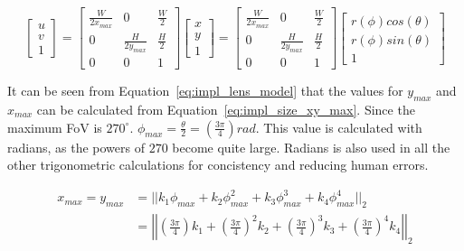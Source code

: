 \begin{equation}
    \begin{bmatrix}
        u \\ v \\ 1
    \end{bmatrix} = \begin{bmatrix}
        \frac{W}{2x_{max}} & 0 & \frac{W}{2} \\
        0 & \frac{H}{2y_{max}} & \frac{H}{2} \\
        0 & 0 & 1
    \end{bmatrix}\begin{bmatrix}
        x \\ y \\ 1
    \end{bmatrix} =
    \begin{bmatrix}
        \frac{W}{2x_{max}} & 0 & \frac{W}{2} \\
        0 & \frac{H}{2y_{max}} & \frac{H}{2} \\
        0 & 0 & 1
    \end{bmatrix}\begin{bmatrix}
        r(\phi) cos(\theta) \\ r(\phi) sin(\theta) \\ 1
    \end{bmatrix}
    \label{eq:impl_pixel_transform_final}
\end{equation}

It can be seen from Equation~\eqref{eq:impl_lens_model} that the values for $y_{max}$ and $x_{max}$ can be calculated from Equation~\eqref{eq:impl_size_xy_max}. Since the maximum FoV is $270^\circ$.  $\phi_{max} = \frac{\theta}{2} = \left(\frac{3 \pi}{4}\right) rad$. This value is calculated with radians, as the powers of $270$ become quite large. Radians is also used in all the other trigonometric calculations for concistency and reducing human errors. 

\begin{equation}
    \begin{aligned}
        x_{max} = y_{max} &= ||k_1 \phi_{max} + k_2 \phi_{max}^2 + k_3 \phi_{max}^3 + k_4 \phi_{max}^4 ||_2 \\
        &= \left|\left| \left(\frac{3 \pi}{4}\right)k_1 + \left(\frac{3 \pi}{4}\right)^2 k_2 + \left(\frac{3 \pi}{4}\right)^3 k_3 + \left(\frac{3 \pi}{4}\right)^4 k_4 \right|\right|_2
    \end{aligned}
    \label{eq:impl_size_xy_max}
\end{equation}


